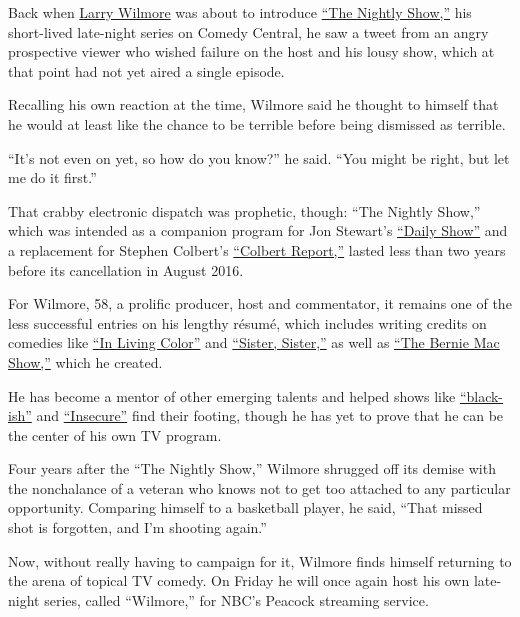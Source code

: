 Back when \href{https://www.thelarrywilmore.com/}{Larry Wilmore} was
about to introduce
\href{http://www.cc.com/shows/the-nightly-show-with-larry-wilmore}{``The
Nightly Show,''} his short-lived late-night series on Comedy Central, he
saw a tweet from an angry prospective viewer who wished failure on the
host and his lousy show, which at that point had not yet aired a single
episode.

Recalling his own reaction at the time, Wilmore said he thought to
himself that he would at least like the chance to be terrible before
being dismissed as terrible.

``It's not even on yet, so how do you know?'' he said. ``You might be
right, but let me do it first.''

That crabby electronic dispatch was prophetic, though: ``The Nightly
Show,'' which was intended as a companion program for Jon Stewart's
\href{http://www.cc.com/shows/the-daily-show-with-jon-stewart}{``Daily
Show''} and a replacement for Stephen Colbert's
\href{http://www.cc.com/shows/the-colbert-report}{``Colbert Report,''}
lasted less than two years before its cancellation in August 2016.

For Wilmore, 58, a prolific producer, host and commentator, it remains
one of the less successful entries on his lengthy résumé, which includes
writing credits on comedies like
\href{https://www.youtube.com/watch?v=_QhuBIkPXn0}{``In Living Color''}
and \href{https://www.youtube.com/watch?v=r-UhYRXYG8c}{``Sister,
Sister,''} as well as
\href{https://www.youtube.com/watch?v=-_FYMH4OUUk\&t=8s}{``The Bernie
Mac Show,''} which he created.

He has become a mentor of other emerging talents and helped shows like
\href{https://abc.com/shows/blackish}{``black-ish''} and
\href{https://www.hbo.com/insecure}{``Insecure''} find their footing,
though he has yet to prove that he can be the center of his own TV
program.

Four years after the ``The Nightly Show,'' Wilmore shrugged off its
demise with the nonchalance of a veteran who knows not to get too
attached to any particular opportunity. Comparing himself to a
basketball player, he said, ``That missed shot is forgotten, and I'm
shooting again.''

Now, without really having to campaign for it, Wilmore finds himself
returning to the arena of topical TV comedy. On Friday he will once
again host his own late-night series, called ``Wilmore,'' for NBC's
Peacock streaming service.

